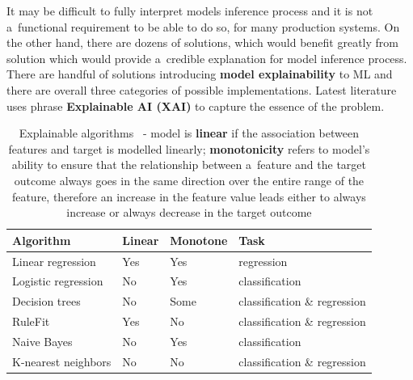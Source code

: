It may be difficult to fully interpret models inference process and it is not a~functional requirement to be able to do so, for many production systems.
On the other hand, there are dozens of solutions, which would benefit greatly from solution which would provide a~credible explanation for model inference process.
There are handful of solutions introducing \textbf{model explainability} to ML and there are overall three categories of possible implementations.
Latest literature uses phrase \textbf{Explainable AI (XAI)} to capture the essence of the problem.

\begin{table}
    \centering

    \begin{tabular}{llll}
        \toprule
        Algorithm & Linear & Monotone & Task \\
        \midrule
        Linear regression & Yes & Yes & regression \\
        Logistic regression & No & Yes & classification \\
        Decision trees & No & Some & classification \& regression \\
        RuleFit & Yes & No & classification \& regression \\
        Naive Bayes & No & Yes & classification \\
        K-nearest neighbors & No & No & classification \& regression \\
        \bottomrule
    \end{tabular}

    \caption{Explainable algorithms~\cite{webbook:interpretable_machine_learning} - model is \textbf{linear} if the association between features and target is modelled linearly; \textbf{monotonicity} refers to model's ability to ensure that the relationship between a~feature and the target outcome always goes in the same direction over the entire range of the feature, therefore an increase in the feature value leads either to always increase or always decrease in the target outcome}
    \label{table:explainable-algorithms}
\end{table}
\FloatBarrier

